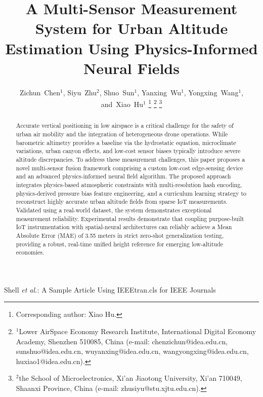 \documentclass[lettersize,journal]{IEEEtran}
\begin{document}
\title{
A Multi-Sensor Measurement System for Urban Altitude Estimation Using Physics-Informed Neural Fields
}

\author{
        Zichun~Chen$^{1}$,
        Siyu~Zhu$^{2}$,
        Shuo~Sun$^{1}$,
        Yanxing~Wu$^{1}$,
        Yongxing~Wang$^{1}$,
        and~Xiao~Hu$^{1}$
\thanks{Corresponding author: Xiao Hu.}
\thanks{$^{1}$Lower AirSpace Economy Research Institute, International Digital Economy Academy, Shenzhen 510085, China (e-mail: chenzichun@idea.edu.cn, sunshuo@idea.edu.cn, wuyanxing@idea.edu.cn, wangyongxing@idea.edu.cn, huxiao1@idea.edu.cn).}
\thanks{$^{2}$the School of Microelectronics, Xi'an Jiaotong University, Xi'an 710049, Shaanxi Province, China (e-mail: zhusiyu@stu.xjtu.edu.cn).
}
}

%
{Shell \MakeLowercase{\textit{et al.}}: A Sample Article Using IEEEtran.cls for IEEE Journals}


\maketitle

\begin{abstract}
Accurate vertical positioning in low airspace is a critical challenge for the safety of urban air mobility and the integration of heterogeneous drone operations. While barometric altimetry provides a baseline via the hydrostatic equation, microclimate variations, urban canyon effects, and low-cost sensor biases typically introduce severe altitude discrepancies. To address these measurement challenges, this paper proposes a novel multi-sensor fusion framework comprising a custom low-cost edge-sensing device and an advanced physics-informed neural field algorithm. The proposed approach integrates physics-based atmospheric constraints with multi-resolution hash encoding, physics-derived pressure bias feature engineering, and a curriculum learning strategy to reconstruct highly accurate urban altitude fields from sparse IoT measurements. Validated using a real-world dataset, the system demonstrates exceptional measurement reliability. Experimental results demonstrate that coupling purpose-built IoT instrumentation with spatial-neural architectures can reliably achieve a Mean Absolute Error (MAE) of 3.55 meters in strict zero-shot generalization testing, providing a robust, real-time unified height reference for emerging low-altitude economies.
\end{abstract}
\end{document}

